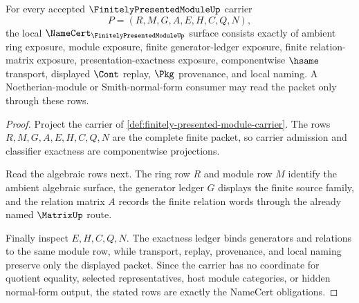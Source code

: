 \begin{theorem}
\label{thm:finitely-presented-module-namecert-obligations}
For every accepted $\FinitelyPresentedModuleUp$ carrier
$$
P=(R,M,G,A,E,H,C,Q,N),
$$
the local $\NameCert_{\FinitelyPresentedModuleUp}$ surface consists exactly of ambient ring exposure, module exposure, finite generator-ledger exposure, finite relation-matrix exposure, presentation-exactness exposure, componentwise $\hsame$ transport, displayed $\Cont$ replay, $\Pkg$ provenance, and local naming. A Noetherian-module or Smith-normal-form consumer may read the packet only through these rows.
\end{theorem}
\begin{proof}
Project the carrier of \autoref{def:finitely-presented-module-carrier}. The rows $R,M,G,A,E,H,C,Q,N$ are the complete finite packet, so carrier admission and classifier exactness are componentwise projections.

Read the algebraic rows next. The ring row $R$ and module row $M$ identify the ambient algebraic surface, the generator ledger $G$ displays the finite source family, and the relation matrix $A$ records the finite relation words through the already named $\MatrixUp$ route.

Finally inspect $E,H,C,Q,N$. The exactness ledger binds generators and relations to the same module row, while transport, replay, provenance, and local naming preserve only the displayed packet. Since the carrier has no coordinate for quotient equality, selected representatives, host module categories, or hidden normal-form output, the stated rows are exactly the NameCert obligations.
\end{proof}

